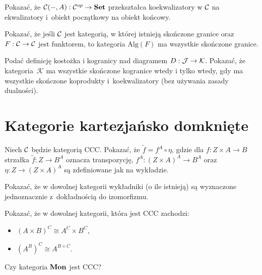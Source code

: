 \begin{zadanie}
Pokazać, że $\mathcal{C}(-,A):\mathcal{C}^{op}\to \mathbf{Set}$ przekształca koekwalizatory w $\mathcal{C}$ na ekwalizatory i~obiekt początkowy na obiekt końcowy.
\end{zadanie}

\begin{zadanie}
Pokazać, że jeśli $\mathcal{C}$ jest kategorią, w której istnieją skończone granice oraz $F:\mathcal{C}\to \mathcal{C}$ jest funktorem, to kategoria $\mathrm{Alg}(F)$ ma wszystkie skończone granice. 
\end{zadanie}

\begin{zadanie}
Podać definicję kostożka i kogranicy nad diagramem $D:\mathcal{J}\to \mathcal{K}$. Pokazać, że kategoria~$\mathcal{K}$ ma wszystkie skończone kogranice wtedy i tylko wtedy, gdy ma wszystkie skończone koprodukty i~koekwalizatory (bez używania zasady dualności). 
\end{zadanie}

\clearpage
\section{Kategorie kartezjańsko domknięte}

\begin{zadanie}
Niech $\mathcal{C}$ będzie kategorią CCC. Pokazać, że $\tilde{f} = f^A\circ \eta$, gdzie dla $f:Z\times A\to B$ 
strzałka $\tilde{f}:Z\to B^A$ oznacza transpozycję, $f^A:(Z\times A)^A\to B^A$ oraz $\eta:Z\to (Z\times A)^A$ są zdefiniowane 
jak na wykładzie.
\end{zadanie}

\begin{zadanie}
    Pokazać, że w dowolnej kategorii wykładniki (o ile istnieją) są wyznaczone jednoznacznie z~dokładnością do izomorfizmu. 
\end{zadanie}

\begin{zadanie}\label{zad:ccc-izo}
Pokazać, że w dowolnej kategorii, która jest CCC zachodzi:
\begin{itemize}
\item $(A\times B)^C \cong A^C\times B^C$,
\item $(A^B)^C \cong A^{B\times C}$.
\end{itemize}
\end{zadanie}

\begin{zadanie}\label{zad:mon-ccc}
Czy kategoria $\mathbf{Mon}$ jest CCC?
\end{zadanie}

